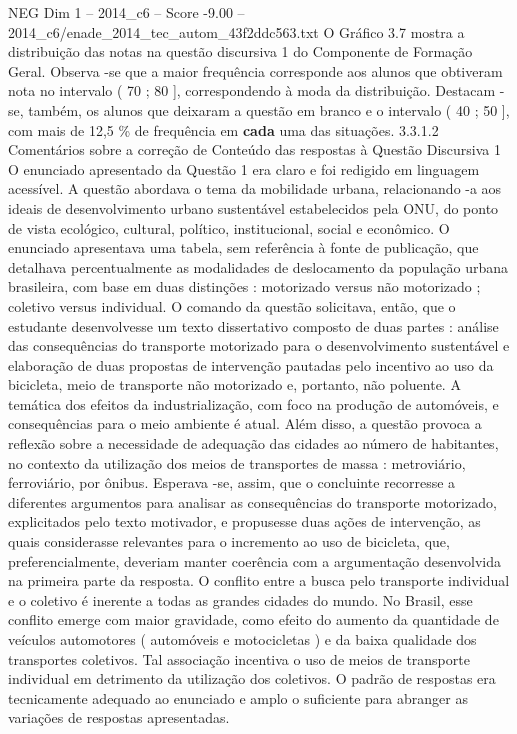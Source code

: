 \begin{textsample}{NEG Dim 1 – 2014\_c6 – Score -9.00 – 2014\_c6/enade\_2014\_tec\_autom\_43f2ddc563.txt}
O Gráfico 3.7 mostra a distribuição das notas na questão discursiva 1 do Componente de Formação Geral.
Observa -se que a maior frequência corresponde aos alunos que obtiveram nota no intervalo ( 70 ; 80 ], correspondendo à moda da distribuição.
Destacam -se, também, os alunos que deixaram a questão em branco e o intervalo ( 40 ; 50 ], com mais de 12,5 \% de frequência em \textbf{cada} uma das situações. 3.3.1.2 Comentários sobre a correção de Conteúdo das respostas à Questão Discursiva 1 O enunciado apresentado da Questão 1 era claro e foi redigido em linguagem acessível.
A questão abordava o tema da mobilidade urbana, relacionando -a aos ideais de desenvolvimento urbano sustentável estabelecidos pela ONU, do ponto de vista ecológico, cultural, político, institucional, social e econômico.
O enunciado apresentava uma tabela, sem referência à fonte de publicação, que detalhava percentualmente as modalidades de deslocamento da população urbana brasileira, com base em duas distinções : motorizado versus não motorizado ; coletivo versus individual.
O comando da questão solicitava, então, que o estudante desenvolvesse um texto dissertativo composto de duas partes : análise das consequências do transporte motorizado para o desenvolvimento sustentável e elaboração de duas propostas de intervenção pautadas pelo incentivo ao uso da bicicleta, meio de transporte não motorizado e, portanto, não poluente.
A temática dos efeitos da industrialização, com foco na produção de automóveis, e consequências para o meio ambiente é atual.
Além disso, a questão provoca a reflexão sobre a necessidade de adequação das cidades ao número de habitantes, no contexto da utilização dos meios de transportes de massa : metroviário, ferroviário, por ônibus.
Esperava -se, assim, que o concluinte recorresse a diferentes argumentos para analisar as consequências do transporte motorizado, explicitados pelo texto motivador, e propusesse duas ações de intervenção, as quais considerasse relevantes para o incremento ao uso de bicicleta, que, preferencialmente, deveriam manter coerência com a argumentação desenvolvida na primeira parte da resposta.
O conflito entre a busca pelo transporte individual e o coletivo é inerente a todas as grandes cidades do mundo.
No Brasil, esse conflito emerge com maior gravidade, como efeito do aumento da quantidade de veículos automotores ( automóveis e motocicletas ) e da baixa qualidade dos transportes coletivos.
Tal associação incentiva o uso de meios de transporte individual em detrimento da utilização dos coletivos.
O padrão de respostas era tecnicamente adequado ao enunciado e amplo o suficiente para abranger as variações de respostas apresentadas.

\end{textsample}
